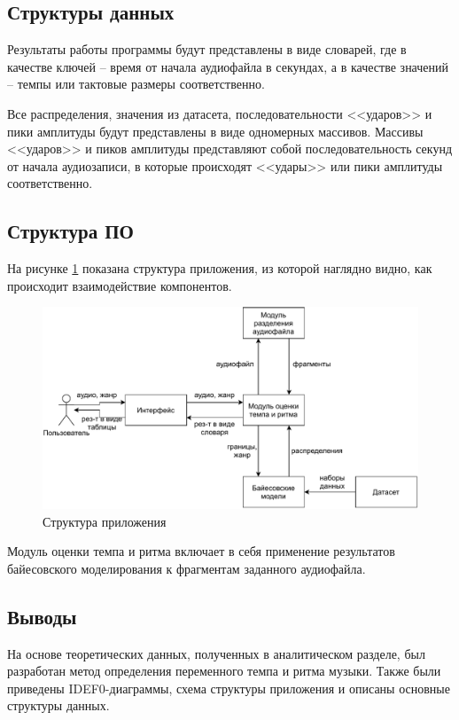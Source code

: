 \clearpage

\subsection{Структуры данных}

Результаты работы программы будут представлены в виде словарей, где в качестве ключей -- время от начала аудиофайла в секундах, а в качестве значений -- темпы или тактовые размеры соответственно.

Все распределения, значения из датасета, последовательности <<ударов>> и пики амплитуды будут представлены в виде одномерных массивов. Массивы <<ударов>> и пиков амплитуды представляют собой последовательность секунд от начала аудиозаписи, в которые происходят <<удары>> или пики амплитуды соответственно.

\subsection{Структура ПО}

На рисунке \ref{img:sw_structure} показана структура приложения, из которой наглядно видно, как происходит взаимодействие компонентов.

\begin{figure}[h]
	\centering
	\includegraphics[scale=0.9]{svg/sw_structure.pdf}
	\caption{Структура приложения}
	\label{img:sw_structure}
\end{figure}

Модуль оценки темпа и ритма включает в себя применение результатов байесовского моделирования к фрагментам заданного аудиофайла.

\subsection*{Выводы}

На основе теоретических данных, полученных в аналитическом разделе, был разработан метод определения переменного темпа и ритма музыки. Также были приведены IDEF0-диаграммы, схема структуры приложения и описаны основные структуры данных.

